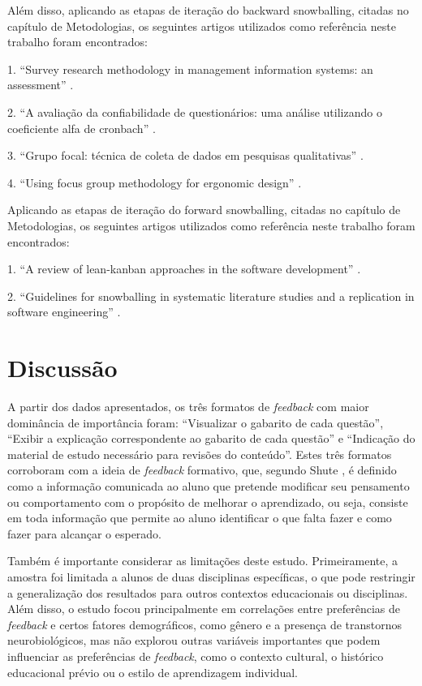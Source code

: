 Além disso, aplicando as etapas de iteração do backward snowballing, citadas no capítulo de Metodologias, os seguintes artigos utilizados como referência neste trabalho foram encontrados:

1. ``Survey research methodology in management information systems: an assessment'' \cite{pinsonneault1993survey}.

2. ``A avaliação da confiabilidade de questionários: uma análise utilizando o coeficiente alfa de cronbach'' \cite{freitas2005avaliaccao}.

3. ``Grupo focal: técnica de coleta de dados em pesquisas qualitativas'' \cite{dias2000grupo}.

4. ``Using focus group methodology for ergonomic design'' \cite{caplan1990using}.

Aplicando as etapas de iteração do forward snowballing, citadas no capítulo de Metodologias, os seguintes artigos utilizados como referência neste trabalho foram encontrados:

1. ``A review of lean-kanban approaches in the software development'' \cite{corona2013review}.

2. ``Guidelines for snowballing in systematic literature studies and a replication in software engineering'' \cite{wohlin2014guidelines}.

\section{Discussão}

A partir dos dados apresentados, os três formatos de \textit{feedback} com maior dominância de importância foram: ``Visualizar o gabarito de cada questão'', ``Exibir a explicação correspondente ao gabarito de cada questão'' e ``Indicação do material de estudo necessário para revisões do conteúdo''. Estes três formatos corroboram com a ideia de \textit{feedback} formativo, que, segundo Shute \cite{shute2008focus}, é definido como a informação comunicada ao aluno que pretende modificar seu pensamento ou comportamento com o propósito de melhorar o aprendizado, ou seja, consiste em toda informação que permite ao aluno identificar o que falta fazer e como fazer para alcançar o esperado.

Também é importante considerar as limitações deste estudo. Primeiramente, a amostra foi limitada a alunos de duas disciplinas específicas, o que pode restringir a generalização dos resultados para outros contextos educacionais ou disciplinas. Além disso, o estudo focou principalmente em correlações entre preferências de \textit{feedback} e certos fatores demográficos, como gênero e a presença de transtornos neurobiológicos, mas não explorou outras variáveis importantes que podem influenciar as preferências de \textit{feedback}, como o contexto cultural, o histórico educacional prévio ou o estilo de aprendizagem individual.

